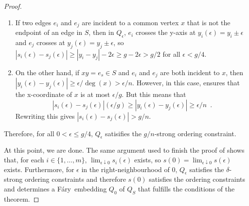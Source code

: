 \documentclass{patmorin}
\newcommand{\Fary}{Fáry}
\begin{document}
\begin{proof}
  \begin{enumerate}
     \item If two edges $e_i$ and $e_j$ are incident to a common
     vertex $x$ that is not the endpoint of an edge in $S$, then
     in $Q_\epsilon$, $e_i$ crosses the y-axis at $y_i(\epsilon) =
     y_i\pm\epsilon$ and $e_j$ crosses at $y_j(\epsilon)=y_j\pm\epsilon$,
     so $|s_i(\epsilon)-s_j(\epsilon)| \ge |y_i-y_j|-2\epsilon \ge
     g-2\epsilon > g/2$ for all $\epsilon < g/4$.

    \item On the other hand, if $xy=e_s\in S$ and $e_i$ and $e_j$
    are both incident to $x$, then $|y_i(\epsilon)-y_j(\epsilon)| \ge
    \epsilon/\deg(x) > \epsilon/n$.  However, in this case,  ensures that the x-coordinate of $x$ is at
    most $\epsilon/g$.  But this means that
    \[
       |s_i(\epsilon)-s_j(\epsilon)|(\epsilon/g) 
            \ge |y_i(\epsilon)-y_j(\epsilon)| 
            \ge \epsilon/n \enspace .
    \]
    Rewriting this gives $|s_i(\epsilon)-s_j(\epsilon)| > g/n$.  
  \end{enumerate}
  Therefore, for all $0<\epsilon\le g/4$, $Q_\epsilon$ satisifies the
  $g/n$-strong ordering constraint.

  At this point, we are done. The same argument used to
  finish the proof of  shows that, for each
  $i\in\{1,\ldots,m\}$, $\lim_{\epsilon\downarrow 0} s_i(\epsilon)$
  exists, so $s(0)=\lim_{\epsilon\downarrow 0} s(\epsilon)$ exists.
  Furthermore, for $\epsilon$ in the right-neighbourhood of $0$, $Q_\epsilon$
  satisfies the $\delta$-strong ordering constraints and therefore $s(0)$
  satisfies the ordering constraints and determines a \Fary\ embedding $Q_0$
  of $Q_S$ that fulfills the conditions of the theorem.
\end{proof}


%
%
%
%
\end{document}
